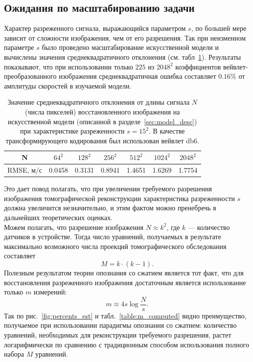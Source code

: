 \documentclass[14pt]{matmex-diploma}
\begin{document}
\subsection{Ожидания по масштабированию задачи}

Характер разреженного сигнала, выражающийся параметром $s$, по большей мере зависит от сложности изображения, чем от его разрешения. Так при неизменном параметре $s$ было проведено масштабирование искусственной модели и вычислены значения среднеквадратичного отклонения (см. табл~\ref{table:problem_scaling}). Результаты показывают, что при использовании только $225$ из $2048^2$ коэффициентов вейвлет-преобразованного изображения среднеквадратичная ошибка составляет $0.16\%$ от амплитуды скоростей в изучаемой модели.

\begin{table}[h]
\centering
\begin{tabular}{ c | c | c | c | c | c | c }
    \hline
    N & $64^2$ & $128^2$ & $256^2$ & $512^2$ & $1024^2$ & $2048^2$ \\
    \hline
    RMSE, м/с & 0.0458 & 0.3131 & 0.8941 & 1.4651 & 1.6269 & 1.7754 \\
    \hline
\end{tabular}
\caption{\small Значение среднеквадратичного отклонения от длины сигнала $N$ (числа пикселей) восстановленного изображения на искусственной модели (описанной в разделе~\ref{sec:model_desc}) при характеристике разреженности $s = 15^2$. В качестве трансформирующего кодирования был использован вейвлет db6.}
\label{table:problem_scaling}
\end{table}

Это дает повод полагать, что при увеличении требуемого разрешения изображения томографической реконструкции характеристика разреженности $s$ должна увеличится незначительно, и этим фактом можно пренебречь в дальнейших теоретических оценках.\\

Можем полагать, что разрешение изображения $N \approx k^2$, где $k$ --- количество датчиков в устройстве. Тогда число уравнений, получаемых в результате максимально возможного числа проекций томографического обследования составляет \[M = k\cdot (k-1).\] Полезным результатом теории опознания со сжатием является тот факт, что для восстановления разреженного изображения достаточным является использование только $m$ измерений:
\begin{equation}\label{eq:approx_m}
m \approx 4 s  \log{\frac{N}{s}}.
\end{equation}
Так по рис.~\ref{fig:percents_est} и табл.~\ref{table:m_computed} видно преимущество, получаемое при использовании парадигмы опознания со сжатием: количество уравнений, необходимых для реконструкции требуемого разрешения, растет логарифмически по сравнению с традиционным способом использования полного набора $M$ уравнений.
\end{document}
